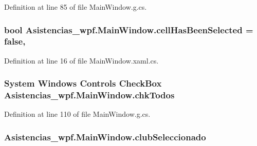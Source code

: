 Definition at line 85 of file Main\-Window.\-g.\-cs.

\hypertarget{class_asistencias__wpf_1_1_main_window_ade98915e9943a63d9b723da6e1f50ec7}{
\subsubsection[{cell\-Has\-Been\-Selected}]{\setlength{\rightskip}{0pt plus 5cm}bool Asistencias\-\_\-wpf.\-Main\-Window.\-cell\-Has\-Been\-Selected = false\hspace{0.3cm}{\ttfamily [static]}, {\ttfamily [private]}}}\label{class_asistencias__wpf_1_1_main_window_ade98915e9943a63d9b723da6e1f50ec7}


Definition at line 16 of file Main\-Window.\-xaml.\-cs.

\hypertarget{class_asistencias__wpf_1_1_main_window_adcd4add51c03081da4c3c0cc80125b45}{
\subsubsection[{chk\-Todos}]{\setlength{\rightskip}{0pt plus 5cm}System Windows Controls Check\-Box Asistencias\-\_\-wpf.\-Main\-Window.\-chk\-Todos\hspace{0.3cm}{\ttfamily [package]}}}\label{class_asistencias__wpf_1_1_main_window_adcd4add51c03081da4c3c0cc80125b45}


Definition at line 110 of file Main\-Window.\-g.\-cs.

\hypertarget{class_asistencias__wpf_1_1_main_window_ae8ae45fcbef622a8a77ff2a2839850d8}{
\subsubsection[{club\-Seleccionado}]{ Asistencias\-\_\-wpf.\-Main\-Window.\-club\-Seleccionado\hspace{0.3cm}{\ttfamily [private]}}}\label{class_asistencias__wpf_1_1_main_window_ae8ae45fcbef622a8a77ff2a2839850d8}


